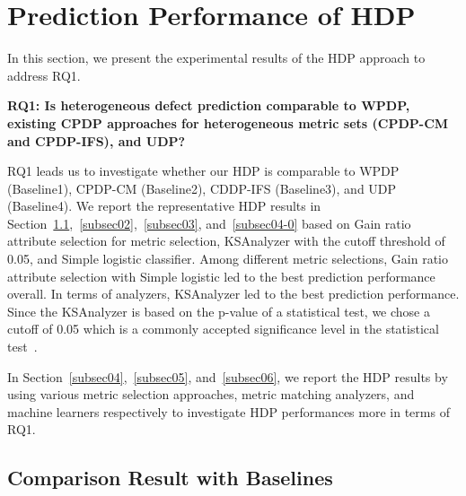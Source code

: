\section{Prediction Performance of HDP}
\label{sec:Result}
In this section, we present the experimental results of the HDP approach to address RQ1.

{\bf RQ1: Is heterogeneous defect prediction comparable to WPDP, existing CPDP approaches for heterogeneous metric sets (CPDP-CM and CPDP-IFS), and UDP?}

RQ1 leads us to investigate whether our
HDP is comparable to WPDP (Baseline1), CPDP-CM
(Baseline2), CDDP-IFS (Baseline3), and UDP (Baseline4). We report the representative HDP results in Section~\ref{subsec01},~\ref{subsec02},~\ref{subsec03}, and~\ref{subsec04-0} based on Gain ratio attribute selection for metric selection, KSAnalyzer with the cutoff threshold of 0.05, and Simple logistic classifier. Among different
metric selections, Gain ratio attribute selection with Simple logistic led to the best
prediction performance overall. In terms of analyzers, KSAnalyzer led to the best prediction performance.
Since the KSAnalyzer is based on the p-value of a statistical test, we chose a cutoff of 0.05 which is a commonly accepted significance level in the
statistical test~\cite{Corder09}.

In Section~\ref{subsec04},~\ref{subsec05}, and~\ref{subsec06}, we report the HDP results by using various metric selection approaches, metric matching analyzers, and machine learners respectively to investigate HDP performances more in terms of RQ1.

\subsection{Comparison Result with Baselines}
\label{subsec01}%

